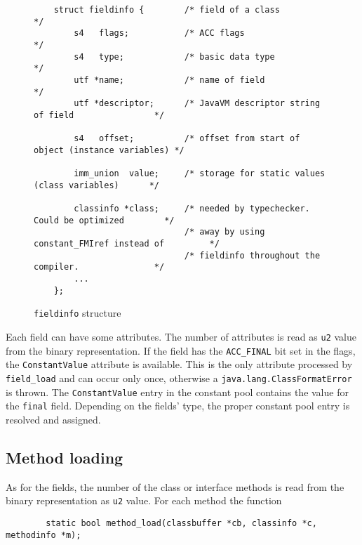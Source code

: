 \begin{figure}[h]
\begin{verbatim}
    struct fieldinfo {        /* field of a class                                 */
        s4   flags;           /* ACC flags                                        */
        s4   type;            /* basic data type                                  */
        utf *name;            /* name of field                                    */
        utf *descriptor;      /* JavaVM descriptor string of field                */
	
        s4   offset;          /* offset from start of object (instance variables) */

        imm_union  value;     /* storage for static values (class variables)      */

        classinfo *class;     /* needed by typechecker. Could be optimized        */
                              /* away by using constant_FMIref instead of         */
                              /* fieldinfo throughout the compiler.               */
        ...
    };
\end{verbatim}
\caption{\texttt{fieldinfo} structure}
\label{fieldinfostructure}
\end{figure}

Each field can have some attributes. The number of attributes is read
as \texttt{u2} value from the binary representation. If the field has
the \texttt{ACC\_FINAL} bit set in the flags, the
\texttt{ConstantValue} attribute is available. This is the only
attribute processed by \texttt{field\_load} and can occur only once,
otherwise a \texttt{java.lang.ClassFormatError} is thrown. The
\texttt{ConstantValue} entry in the constant pool contains the value
for the \texttt{final} field. Depending on the fields' type, the
proper constant pool entry is resolved and assigned.


\subsection{Method loading}
\label{sectionmethodloading}

As for the fields, the number of the class or interface methods is read from
the binary representation as \texttt{u2} value. For each method the function

\begin{verbatim}
        static bool method_load(classbuffer *cb, classinfo *c, methodinfo *m);
\end{verbatim}

